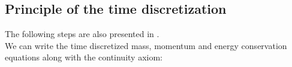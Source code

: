\subsection{Principle of the time discretization}
The following steps are also presented in \cite{GerschenfeldPolyMAC2022}. \\
We can write the time discretized mass, momentum and energy conservation equations along with the continuity axiom:

